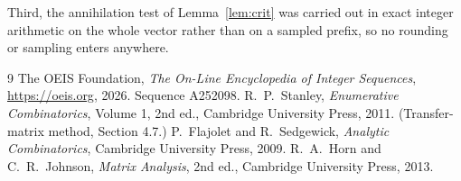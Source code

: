 \documentclass[11pt,a4paper]{article}
\theoremstyle{plain}
\theoremstyle{definition}
\begin{document}
Third, the annihilation test of Lemma~\ref{lem:crit} was carried out in exact integer
arithmetic on the whole vector rather than on a sampled prefix, so no rounding or sampling
enters anywhere.

\begin{thebibliography}{9}
 The OEIS Foundation, \emph{The On-Line Encyclopedia of Integer
Sequences}, \url{https://oeis.org}, 2026. Sequence A252098.
 R.~P.~Stanley, \emph{Enumerative Combinatorics}, Volume 1, 2nd ed.,
Cambridge University Press, 2011. (Transfer-matrix method, Section 4.7.)
 P.~Flajolet and R.~Sedgewick, \emph{Analytic Combinatorics}, Cambridge
University Press, 2009.
 R.~A.~Horn and C.~R.~Johnson, \emph{Matrix Analysis}, 2nd ed., Cambridge
University Press, 2013.
\end{thebibliography}
\end{document}
